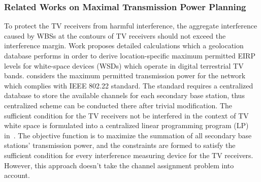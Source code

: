 \documentclass[times]{ettauth}
\theoremstyle{mytheoremstyle}
\theoremstyle{mytheoremstyle}
\theoremstyle{mytheoremstyle}
\begin{document}



\subsubsection*{Related Works on Maximal Transmission Power Planning}
\label{MPowerPlanning}
  
To protect the TV receivers from harmful interference, the aggregate interference caused by WBSs at the contours of TV receivers should not exceed the interference margin.
Work \cite{maximum_power_TVWS_dyspan_2011} proposes detailed calculations which a geolocation database performs in order to derive location-specific maximum permitted EIRP levels for white-space devices (WSDs) which operate in digital terrestrial TV bands.
\cite{multipleIntf_pimrc11} considers the maximum permitted transmission power for the network which complies with IEEE 802.22 standard. 
The standard requires a centralized database to store the available channels for each secondary base station, thus centralized scheme can be conducted there after trivial modification.
The sufficient condition for the TV receivers not be interfered in the context of TV white space is formulated into a centralized linear programming program (LP) in~\cite{multipleIntf_pimrc11}.
The objective function is to maximize the summation of all secondary base stations' transmission power, and the constraints are formed to satisfy the sufficient condition for every interference measuring device for the TV receivers. 
However, this approach doesn't take the channel assignment problem into account.
\end{document}
